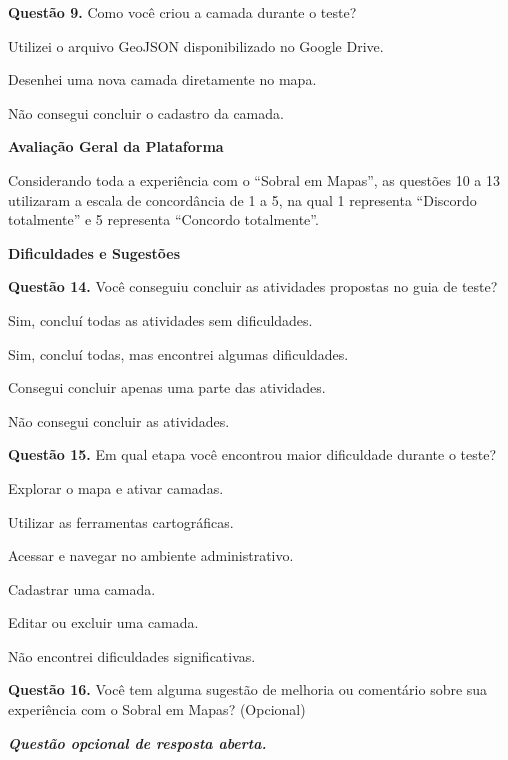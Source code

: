 
\noindent\textbf{Questão 9.} Como você criou a camada durante o teste?
\begin{alternativasFormulario}
    \item Utilizei o arquivo GeoJSON disponibilizado no Google Drive.
    \item Desenhei uma nova camada diretamente no mapa.
    \item Não consegui concluir o cadastro da camada.
\end{alternativasFormulario}

\noindent\textbf{Avaliação Geral da Plataforma}
\par\medskip

Considerando toda a experiência com o ``Sobral em Mapas'', as questões 10 a 13 utilizaram a escala de concordância de 1 a 5, na qual 1 representa ``Discordo totalmente'' e 5 representa ``Concordo totalmente''.

\medskip
{}




\noindent\textbf{Dificuldades e Sugestões}
\par\medskip

\noindent\textbf{Questão 14.} Você conseguiu concluir as atividades propostas no guia de teste?
\begin{alternativasFormulario}
    \item Sim, concluí todas as atividades sem dificuldades.
    \item Sim, concluí todas, mas encontrei algumas dificuldades.
    \item Consegui concluir apenas uma parte das atividades.
    \item Não consegui concluir as atividades.
\end{alternativasFormulario}

\noindent\textbf{Questão 15.} Em qual etapa você encontrou maior dificuldade durante o teste?
\begin{alternativasFormulario}
    \item Explorar o mapa e ativar camadas.
    \item Utilizar as ferramentas cartográficas.
    \item Acessar e navegar no ambiente administrativo.
    \item Cadastrar uma camada.
    \item Editar ou excluir uma camada.
    \item Não encontrei dificuldades significativas.
\end{alternativasFormulario}

\noindent\textbf{Questão 16.} Você tem alguma sugestão de melhoria ou comentário sobre sua experiência com o Sobral em Mapas? (Opcional)

\medskip
\noindent\textbf{\textit{Questão opcional de resposta aberta.}}
